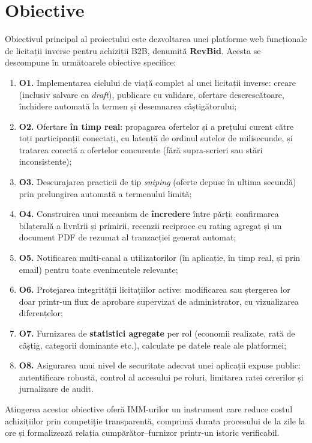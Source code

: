 \section{Obiective}

Obiectivul principal al proiectului este dezvoltarea unei platforme web funcționale de licitații inverse pentru achiziții B2B, denumită \textbf{RevBid}. Acesta se descompune în următoarele obiective specifice:

\begin{enumerate}
    \item \textbf{O1.} Implementarea ciclului de viață complet al unei licitații inverse: creare (inclusiv salvare ca \textit{draft}), publicare cu validare, ofertare descrescătoare, închidere automată la termen și desemnarea câștigătorului;
    \item \textbf{O2.} Ofertare \textbf{în timp real}: propagarea ofertelor și a prețului curent către toți participanții conectați, cu latență de ordinul sutelor de milisecunde, și tratarea corectă a ofertelor concurente (fără supra-scrieri sau stări inconsistente);
    \item \textbf{O3.} Descurajarea practicii de tip \textit{sniping} (oferte depuse în ultima secundă) prin prelungirea automată a termenului limită;
    \item \textbf{O4.} Construirea unui mecanism de \textbf{încredere} între părți: confirmarea bilaterală a livrării și primirii, recenzii reciproce cu rating agregat și un document PDF de rezumat al tranzacției generat automat;
    \item \textbf{O5.} Notificarea multi-canal a utilizatorilor (în aplicație, în timp real, și prin email) pentru toate evenimentele relevante;
    \item \textbf{O6.} Protejarea integrității licitațiilor active: modificarea sau ștergerea lor doar printr-un flux de aprobare supervizat de administrator, cu vizualizarea diferențelor;
    \item \textbf{O7.} Furnizarea de \textbf{statistici agregate} per rol (economii realizate, rată de câștig, categorii dominante etc.), calculate pe datele reale ale platformei;
    \item \textbf{O8.} Asigurarea unui nivel de securitate adecvat unei aplicații expuse public: autentificare robustă, control al accesului pe roluri, limitarea ratei cererilor și jurnalizare de audit.
\end{enumerate}

Atingerea acestor obiective oferă IMM-urilor un instrument care reduce costul achizițiilor prin competiție transparentă, comprimă durata procesului de la zile la ore și formalizează relația cumpărător--furnizor printr-un istoric verificabil.

